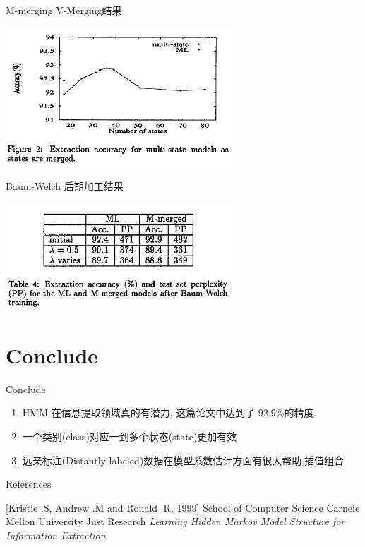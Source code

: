 \documentclass{beamer}
\begin{document}
\begin{frame}{M-merging V-Merging结果}
    \begin{center}
        \includegraphics[width=240pt]{report5/m-picture.png}
    \end{center}
\end{frame}

\begin{frame}{Baum-Welch 后期加工结果}
    \begin{center}
        \includegraphics[width=240pt]{report5/bw.png}
    \end{center}
\end{frame}

\section{Conclude}
\begin{frame}{Conclude}
\begin{enumerate}
    \item HMM 在信息提取领域真的有潜力, 这篇论文中达到了 92.9\%的精度.
    \item 一个类别(class)对应一到多个状态(state)更加有效
    \item 远亲标注(Distantly-labeled)数据在模型系数估计方面有很大帮助,插值组合
\end{enumerate}
\end{frame}

\begin{frame}{References}
\begin{thebibliography}{10}
 [Kristie .S, Andrew .M and Ronald .R, 1999]
    \newblock School of Computer Science Carneie Mellon University
    \newblock Just Research
    \newblock \emph{Learning Hidden Markov Model Structure for Information Extraction}
\end{thebibliography}
\end{frame}
\end{document}
